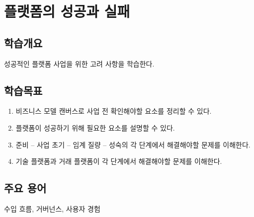 \chapter{플랫폼의 성공과 실패}\label{cha:chikenandeggproblem}

\section*{학습개요}
성공적인 플랫폼 사업을 위한 고려 사항을 학습한다.


\section*{학습목표}
\begin{enumerate}
\item 비즈니스 모델 캔버스로 사업 전 확인해야할 요소를 정리할 수 있다.
\item 플랫폼이 성공하기 위해 필요한 요소를 설명할 수 있다.
\item 준비 -- 사업 초기 -- 임계 질량 -- 성숙의 각 단계에서 해결해야할 문제를 이해한다.
\item 기술 플랫폼과 거래 플랫폼이 각 단계에서 해결해야할 문제를 이해한다.
\end{enumerate}

\section*{주요 용어}
수입 흐름, 거버넌스, 사용자 경험

\pagebreak

